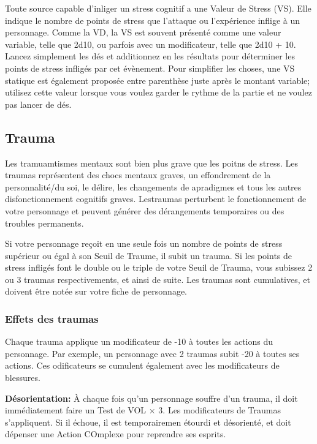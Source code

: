 Toute source capable d'inliger un stress cognitif a une Valeur de Stress (VS). Elle indique le nombre de points de stress que l'attaque ou l'expérience inflige à un personnage. Comme la VD, la VS est souvent présenté comme une valeur variable, telle que 2d10, ou parfois avec un modificateur, telle que 2d10 + 10. Lancez simplement les dés et additionnez en les résultats pour déterminer les points de stress  infligés par cet évènement. Pour simplifier les choses, une VS statique est également proposée entre parenthèse juste après le montant variable; utilisez cette valeur lorsque vous voulez garder le rythme de la partie et ne voulez pas lancer de dés. 

\subsection{Trauma} \label{sec:trauma} 

Les tramuamtismes mentaux sont bien plus grave que les poitns de stress. Les traumas représentent des chocs mentaux graves, un effondrement de la personnalité/du soi, le délire, les changements de apradigmes et tous les autres disfonctionnement cognitifs graves. Lestraumas perturbent le fonctionnement de votre personnage et peuvent générer des dérangements temporaires ou des troubles permanents. 

Si votre personnage reçoit en une seule fois un nombre de points de stress supérieur ou égal à son Seuil de Traume, il subit un trauma. Si les points de stress infligés font le double ou le triple de votre Seuil de Trauma, vous subissez 2 ou 3 traumas respectivements, et ainsi de suite. Les traumas sont cumulatives, et doivent être notée sur votre fiche de personnage. 

\subsubsection{Effets des traumas} 

Chaque trauma applique un modificateur de -10 à toutes les actions du personnage. Par exemple, un personnage avec 2 traumas subit -20 à toutes ses actions. Ces odificateurs se cumulent également avec les modificateurs de blessures. 

\textbf{Désorientation:} À chaque fois qu'un personnage souffre d'un trauma, il doit immédiatement faire un Test de VOL $\times$ 3. Les modificateurs de Traumas s'appliquent. Si il échoue, il est temporairemen étourdi et désorienté, et doit dépenser une Action COmplexe pour reprendre ses esprits. 

